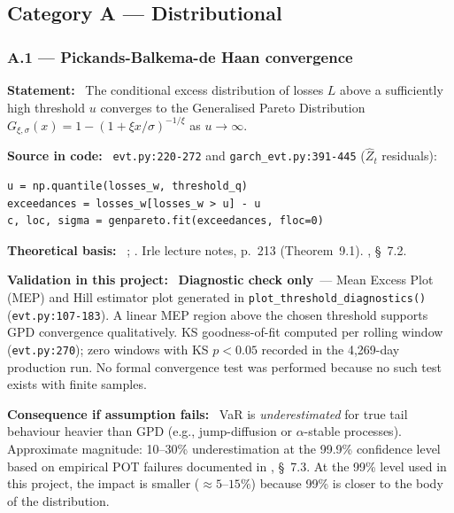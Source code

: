 \documentclass[11pt,a4paper]{article}
\newcommand{\asmfield}[1]{\medskip\noindent\textbf{#1:}\ }
\newcommand{\code}[1]{\texttt{#1}}
\newcommand{\diagnostic}{\textbf{Diagnostic check only}}
\begin{document}
\subsection{Category A --- Distributional}\label{sec:catA}

\subsubsection{A.1 --- Pickands-Balkema-de Haan convergence}\label{asm:A1}

\asmfield{Statement}
The conditional excess distribution of losses $L$ above a sufficiently
high threshold $u$ converges to the Generalised Pareto Distribution
$G_{\xi,\sigma}(x) = 1 - (1 + \xi x/\sigma)^{-1/\xi}$ as $u \to \infty$.

\asmfield{Source in code}
\code{evt.py:220-272} and \code{garch\_evt.py:391-445} ($\hat{Z}_t$ residuals):
\begin{lstlisting}
u = np.quantile(losses_w, threshold_q)
exceedances = losses_w[losses_w > u] - u
c, loc, sigma = genpareto.fit(exceedances, floc=0)
\end{lstlisting}

\asmfield{Theoretical basis}
\cite{Pickands1975}; \cite{BalkemadeHaan1974}. Irle lecture notes,
p.~213 (Theorem~9.1). \cite{McNeilFreyEmbrechts2005}, \S~7.2.

\asmfield{Validation in this project}
\diagnostic\ --- Mean Excess Plot (MEP) and Hill estimator plot generated
in \code{plot\_threshold\_diagnostics()} (\code{evt.py:107-183}). A linear
MEP region above the chosen threshold supports GPD convergence
qualitatively. KS goodness-of-fit computed per rolling window
(\code{evt.py:270}); zero windows with KS $p < 0.05$ recorded in the
4{,}269-day production run. No formal convergence test was performed
because no such test exists with finite samples.

\asmfield{Consequence if assumption fails}
VaR is \emph{underestimated} for true tail behaviour heavier than GPD
(e.g., jump-diffusion or $\alpha$-stable processes). Approximate
magnitude: 10--30\% underestimation at the 99.9\% confidence level based
on empirical POT failures documented in \cite{McNeilFreyEmbrechts2005},
\S~7.3. At the 99\% level used in this project, the impact is smaller
($\approx 5$--$15\%$) because 99\% is closer to the body of the
distribution.
\end{document}
